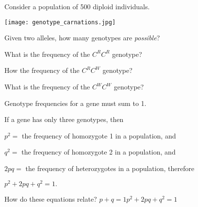 \documentclass[t]{beamer}
\begin{document}
\begin{frame}{Consider a population of 500 diploid individuals.}

	\vspace{-\baselineskip}
	\begin{center}
		\texttt{[image: genotype\_carnations.jpg]}
	\end{center}

	\vspace{-\baselineskip}
	\hangpara Given two alleles, how many genotypes are \textit{possible}?
	\pause
		
	\hangpara What is the frequency of the $C^RC^R$ genotype?
	\pause

	\hangpara How the frequency of the $C^RC^W$ genotype?
	\pause

	\hangpara What is the frequency of the $C^WC^W$ genotype?
	
\end{frame}

\begin{frame}{Genotype frequencies for a gene must sum to 1.}

	\hangpara If a gene has only three genotypes, then

	\hangpara $p^2=$ the frequency of homozygote 1 in a population, and
	\pause
		
	\hangpara $q^2=$ the frequency of homozygote 2 in a population, and
	\pause

	\hangpara $2pq=$ the frequency of heterozygotes in a population, therefore
	\pause
	 
	\hangpara $p^2 + 2pq + q^2=1.$

	\vspace{\baselineskip}
	\hangpara {}
\end{frame}

\begin{frame}{How do these equations relate?}
	\vspace{\baselineskip}
	\centering
	\hspace{6em}$p+q=1$\hfill$p^2 + 2pq + q^2=1$\hspace{6em}
	
\end{frame}
\end{document}
